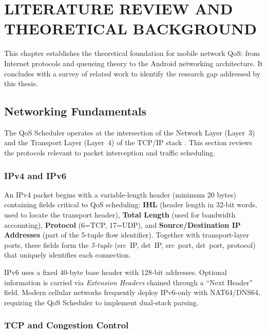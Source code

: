 
\chapter{LITERATURE REVIEW AND THEORETICAL BACKGROUND}
\label{chap:theory}

This chapter establishes the theoretical foundation for mobile network QoS: from Internet protocols and queueing theory to the Android networking architecture. It concludes with a survey of related work to identify the research gap addressed by this thesis.

\section{Networking Fundamentals}
\label{sec:networking_fundamentals}

The QoS Scheduler operates at the intersection of the Network Layer (Layer~3) and the Transport Layer (Layer~4) of the TCP/IP stack \cite{kurose_2021}. This section reviews the protocols relevant to packet interception and traffic scheduling.

\subsection{IPv4 and IPv6}

An IPv4 packet \cite{rfc791} begins with a variable-length header (minimum 20 bytes) containing fields critical to QoS scheduling: \textbf{IHL} (header length in 32-bit words, used to locate the transport header), \textbf{Total Length} (used for bandwidth accounting), \textbf{Protocol} (6=TCP, 17=UDP), and \textbf{Source/Destination IP Addresses} (part of the 5-tuple flow identifier). Together with transport-layer ports, these fields form the \textit{5-tuple} (src~IP, dst~IP, src~port, dst~port, protocol) that uniquely identifies each connection.

IPv6 \cite{rfc8200} uses a fixed 40-byte base header with 128-bit addresses. Optional information is carried via \textit{Extension Headers} chained through a ``Next Header'' field. Modern cellular networks frequently deploy IPv6-only with NAT64/DNS64, requiring the QoS Scheduler to implement dual-stack parsing.

\subsection{TCP and Congestion Control}

